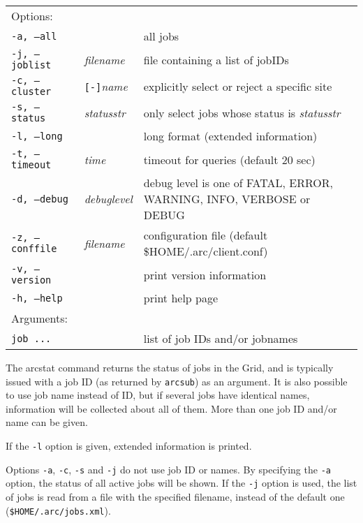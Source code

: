 \begin{shaded}
\end{shaded}
\begin{longtable}{llp{8cm}}
   Options:&&\\
   \texttt{-a, --all}& & all jobs\\
   \texttt{-j, --joblist}& \textit{filename}& file containing a list of jobIDs\\
   \texttt{-c, --cluster}&\verb#[-]#\textit{name}&explicitly select or reject a specific site\\
   \texttt{-s, --status}& \textit{statusstr} &only select jobs whose status is \textit{statusstr}\\
   \texttt{-l, --long}& & long format (extended information)\\
   \texttt{-t, --timeout}& \textit{time}& timeout for queries (default 20 sec)\\
   \texttt{-d, --debug}& \textit{debuglevel}&debug level is one of  FATAL, ERROR, WARNING, INFO, VERBOSE or DEBUG\\
   \texttt{-z, --conffile}&\textit{filename}& configuration file (default {\$}HOME/.arc/client.conf)\\
   \texttt{-v, --version}& & print version information\\
   \texttt{-h, --help}& & print help page\\
   Arguments:&&\\
   \texttt{job ...} && list of job IDs and/or jobnames\\
\end{longtable}

The arcstat command returns the status of jobs in the Grid, and is typically issued with a
job ID (as returned by \verb#arcsub#) as an argument. It is also possible to use job name instead of
ID, but if several jobs have identical names, information will be collected about all of them.
More than one job ID and/or name can be given.

If the \verb#-l# option is given, extended information is printed.

Options \verb#-a#, \verb#-c#, \verb#-s# and \verb#-j# do not use job ID or names. By
specifying the \verb#-a# option, the status of all active jobs will be shown. If the \verb#-j# option
is used, the list of jobs is read from a file with the specified filename, instead of
the default one (\texttt{{\$}HOME/.arc/jobs.xml}).

